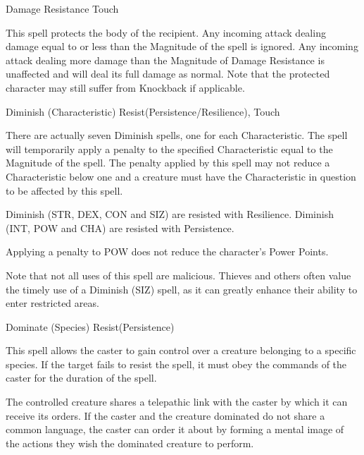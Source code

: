 \begin{rpg-spell}
{Damage Resistance}
{Touch}

This spell protects the body of the recipient. Any incoming attack dealing damage equal to or less than the Magnitude of the spell is ignored. Any incoming attack dealing more damage than the Magnitude of Damage Resistance is unaffected and will deal its full damage as normal. Note that the protected character may still suffer from Knockback if applicable. 
\end{rpg-spell}


\begin{rpg-spell}
{Diminish (Characteristic)}
{Resist(Persistence/Resilience), Touch}

There are actually seven Diminish spells, one for each Characteristic. The spell will temporarily apply a penalty to the specified Characteristic equal to the Magnitude of the spell. The penalty applied by this spell may not reduce a Characteristic below one and a creature must have the Characteristic in question to be affected by this spell. 

Diminish (STR, DEX, CON and SIZ) are resisted with Resilience. Diminish (INT, POW and CHA) are resisted with Persistence. 

Applying a penalty to POW does not reduce the character’s Power Points.

Note that not all uses of this spell are malicious. Thieves and others often value the timely use of a Diminish (SIZ) spell, as it can greatly enhance their ability to enter restricted areas. 
\end{rpg-spell}


\begin{rpg-spell}
{Dominate (Species)}
{Resist(Persistence)}

This spell allows the caster to gain control over a creature belonging to a specific species. If the target fails to resist the spell, it must obey the commands of the caster for the duration of the spell. 

The controlled creature shares a telepathic link with the caster by which it can receive its orders. If the caster and the creature dominated do not share a common language, the caster can order it about by forming a mental image of the actions they wish the dominated creature to perform.
\end{rpg-spell}



